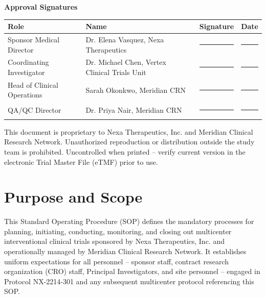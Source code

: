 \documentclass[11pt,a4paper]{scrreprt}
\begin{document}
\begin{titlepage}
\vspace{1.0cm}
{\color{sopnavy}\bfseries Approval Signatures}\\[4pt]
\noindent
\begin{tabularx}{\linewidth}{@{}>{\raggedright\arraybackslash}p{3.6cm} >{\raggedright\arraybackslash}p{4.4cm} X >{\centering\arraybackslash}p{2.1cm}@{}}
\toprule
\textbf{Role} & \textbf{Name} & \textbf{Signature} & \textbf{Date} \\
\midrule
Sponsor Medical Director & Dr. Elena Vasquez, Nexa Therapeutics & \rule{3.2cm}{0.4pt} & \rule{1.6cm}{0.4pt} \\
Coordinating Investigator & Dr. Michael Chen, Vertex Clinical Trials Unit & \rule{3.2cm}{0.4pt} & \rule{1.6cm}{0.4pt} \\
Head of Clinical Operations & Sarah Okonkwo, Meridian CRN & \rule{3.2cm}{0.4pt} & \rule{1.6cm}{0.4pt} \\
QA/QC Director & Dr. Priya Nair, Meridian CRN & \rule{3.2cm}{0.4pt} & \rule{1.6cm}{0.4pt} \\
\bottomrule
\end{tabularx}

\vfill
{\footnotesize\color{sopgray}\raggedright
This document is proprietary to Nexa Therapeutics, Inc. and Meridian Clinical Research
Network. Unauthorized reproduction or distribution outside the study team is prohibited.
Uncontrolled when printed -- verify current version in the electronic Trial Master File (eTMF)
prior to use.\par}
\end{titlepage}


\section{Purpose and Scope}

This Standard Operating Procedure (SOP) defines the mandatory processes for planning,
initiating, conducting, monitoring, and closing out multicenter interventional clinical trials
sponsored by Nexa Therapeutics, Inc. and operationally managed by Meridian Clinical Research
Network. It establishes uniform expectations for all personnel -- sponsor staff, contract
research organization (CRO) staff, Principal Investigators, and site personnel -- engaged in
Protocol NX-2214-301 and any subsequent multicenter protocol referencing this SOP.
\end{document}
